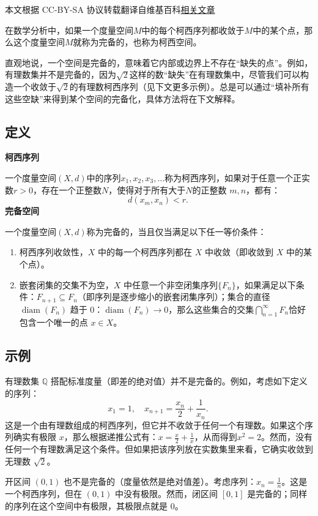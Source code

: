 
本文根据 CC-BY-SA 协议转载翻译自维基百科\href{https://en.wikipedia.org/wiki/Complete_metric_space}{相关文章}

在数学分析中，如果一个度量空间$M$中的每个柯西序列都收敛于$M$中的某个点，那么这个度量空间$M$就称为完备的，也称为柯西空间。

直观地说，一个空间是完备的，意味着它内部或边界上不存在“缺失的点”。例如，有理数集并不是完备的，因为$\sqrt{2}$这样的数“缺失”在有理数集中，尽管我们可以构造一个收敛于$\sqrt{2}$的有理数柯西序列（见下文更多示例）。总是可以通过“填补所有这些空缺”来得到某个空间的完备化，具体方法将在下文解释。
\subsection{定义}
\textbf{柯西序列}

一个度量空间$(X, d)$中的序列$x_{1}, x_{2}, x_{3}, \ldots$称为柯西序列，如果对于任意一个正实数$r > 0$，存在一个正整数$N$，使得对于所有大于$N$的正整数 $m, n$，都有：
$$
d(x_{m}, x_{n}) < r.~
$$
\textbf{完备空间}

一个度量空间$(X, d)$称为完备的，当且仅当满足以下任一等价条件：
\begin{enumerate}
\item 柯西序列收敛性，$X$ 中的每一个柯西序列都在 $X$ 中收敛（即收敛到 $X$ 中的某个点）。
\item 嵌套闭集的交集不为空，$X$ 中任意一个非空闭集序列$\{F_n\}$，如果满足以下条件：$F_{n+1} \subseteq F_n$（即序列是逐步缩小的嵌套闭集序列）；集合的直径 $\operatorname{diam}(F_n)$ 趋于 0：$\operatorname{diam}(F_n) \to 0$，那么这些集合的交集$\bigcap_{n=1}^{\infty} F_n$恰好包含一个唯一的点 $x \in X$。
\end{enumerate}
\subsection{示例}
有理数集 $\mathbb{Q}$ 搭配标准度量（即差的绝对值）并不是完备的。例如，考虑如下定义的序列：
$$
x_1 = 1, \quad x_{n+1} = \frac{x_n}{2} + \frac{1}{x_n}.~
$$
这是一个由有理数组成的柯西序列，但它并不收敛于任何一个有理数。如果这个序列确实有极限 $x$，那么根据递推公式有：$x = \frac{x}{2} + \frac{1}{x}$，从而得到$
x^2 = 2$。然而，没有任何一个有理数满足这个条件。但如果把该序列放在实数集里来看，它确实收敛到无理数 $\sqrt{2}$。

开区间 $(0,1)$ 也不是完备的（度量依然是绝对值差）。考虑序列：$x_n = \frac{1}{n}$。这是一个柯西序列，但在 $(0,1)$ 中没有极限。然而，闭区间 $[0,1]$ 是完备的；同样的序列在这个空间中有极限，其极限点就是 $0$。

